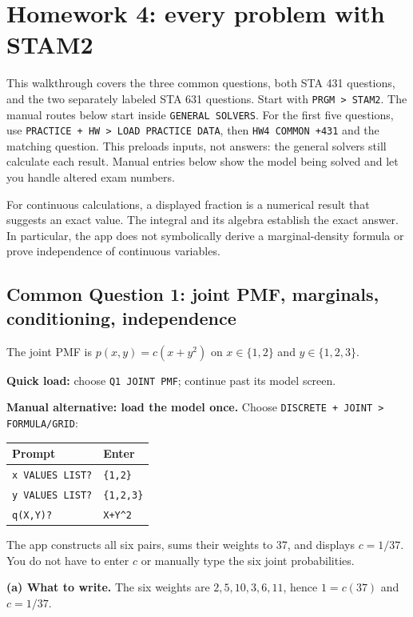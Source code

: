 \section{Homework 4: every problem with STAM2}
\label{sec:hw4-app-walkthrough}
This walkthrough covers the three common questions, both STA 431 questions, and the two separately labeled STA 631 questions. Start with \texttt{PRGM > STAM2}. The manual routes below start inside \texttt{GENERAL SOLVERS}. For the first five questions, use \texttt{PRACTICE + HW > LOAD PRACTICE DATA}, then \texttt{HW4 COMMON +431} and the matching question. This preloads inputs, not answers: the general solvers still calculate each result. Manual entries below show the model being solved and let you handle altered exam numbers.

For continuous calculations, a displayed fraction is a numerical result that suggests an exact value. The integral and its algebra establish the exact answer. In particular, the app does not symbolically derive a marginal-density formula or prove independence of continuous variables.

\subsection{Common Question 1: joint PMF, marginals, conditioning, independence}
The joint PMF is $p(x,y)=c(x+y^2)$ on $x\in\{1,2\}$ and $y\in\{1,2,3\}$.

\textbf{Quick load:} choose \texttt{Q1 JOINT PMF}; continue past its model screen.\par
\textbf{Manual alternative: load the model once.} Choose \texttt{DISCRETE + JOINT > FORMULA/GRID}:
\begin{center}
\begin{tabular}{@{}ll@{}}
\toprule Prompt & Enter\\\midrule
\texttt{x VALUES LIST?} & \texttt{\{1,2\}}\\
\texttt{y VALUES LIST?} & \texttt{\{1,2,3\}}\\
\texttt{q(X,Y)?} & \texttt{X+Y\^{}2}\\\bottomrule
\end{tabular}
\end{center}
The app constructs all six pairs, sums their weights to 37, and displays $c=1/37$. You do not have to enter $c$ or manually type the six joint probabilities.

\textbf{(a) What to write.} The six weights are $2,5,10,3,6,11$, hence $1=c(37)$ and $\boxed{c=1/37}$.

